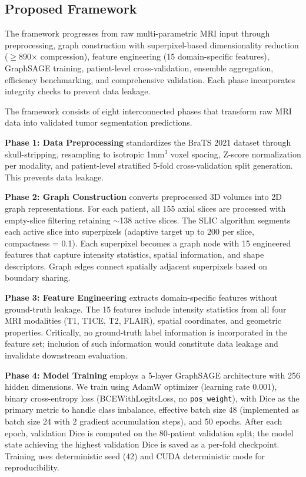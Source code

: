 \documentclass{article}
\begin{document}
\subsection{Proposed Framework}

The framework progresses from raw multi-parametric MRI input through preprocessing, graph construction with superpixel-based dimensionality reduction ($\geq$890$\times$ compression), feature engineering (15 domain-specific features), GraphSAGE \cite{hamilton2017graphsage} training, patient-level cross-validation, ensemble aggregation, efficiency benchmarking, and comprehensive validation. Each phase incorporates integrity checks to prevent data leakage.

The framework consists of eight interconnected phases that transform raw MRI data into validated tumor segmentation predictions.

\textbf{Phase 1: Data Preprocessing} standardizes the BraTS 2021 dataset \cite{menze2015multimodal} through skull-stripping, resampling to isotropic 1mm$^3$ voxel spacing, Z-score normalization per modality, and patient-level stratified 5-fold cross-validation split generation. This prevents data leakage.

\textbf{Phase 2: Graph Construction} converts preprocessed 3D volumes into 2D graph representations. For each patient, all 155 axial slices are processed with empty-slice filtering retaining $\sim$138 active slices. The SLIC algorithm \cite{achanta2012slic} segments each active slice into superpixels (adaptive target up to 200 per slice, compactness = 0.1). Each superpixel becomes a graph node with 15 engineered features that capture intensity statistics, spatial information, and shape descriptors. Graph edges connect spatially adjacent superpixels based on boundary sharing.

\textbf{Phase 3: Feature Engineering} extracts domain-specific features without ground-truth leakage. The 15 features include intensity statistics from all four MRI modalities (T1, T1CE, T2, FLAIR), spatial coordinates, and geometric properties. Critically, no ground-truth label information is incorporated in the feature set; inclusion of such information would constitute data leakage and invalidate downstream evaluation.

\textbf{Phase 4: Model Training} employs a 5-layer GraphSAGE \cite{hamilton2017graphsage} architecture with 256 hidden dimensions. We train using AdamW optimizer \cite{loshchilov2019adamw} (learning rate 0.001), binary cross-entropy loss (BCEWithLogitsLoss, no \texttt{pos\_weight}), with Dice as the primary metric to handle class imbalance, effective batch size 48 (implemented as batch size 24 with 2 gradient accumulation steps), and 50 epochs. After each epoch, validation Dice is computed on the 80-patient validation split; the model state achieving the highest validation Dice is saved as a per-fold checkpoint. Training uses deterministic seed (42) and CUDA deterministic mode for reproducibility.
\end{document}
